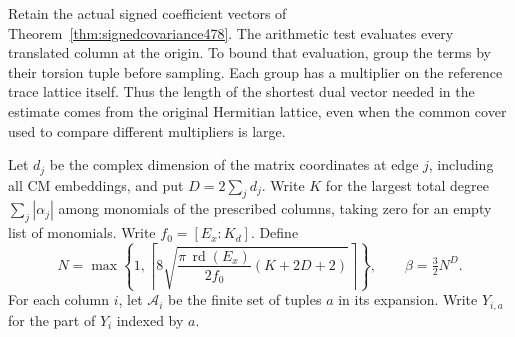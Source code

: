 \documentclass[a4paper,11pt]{article}
\theoremstyle{definition}
\theoremstyle{remark}
\numberwithin{equation}{section}
\begin{document}
Retain the actual signed coefficient vectors of
Theorem~\ref{thm:signedcovariance478}. The arithmetic test evaluates
every translated column at the origin. To bound that evaluation,
group the terms by their torsion tuple before sampling. Each
group has a multiplier on the reference trace lattice itself.
Thus the length of the shortest dual vector needed in the estimate
comes from the original Hermitian lattice, even when the common
cover used to compare different multipliers is large.

Let \(d_j\) be the complex dimension of the matrix coordinates at
edge \(j\), including all CM embeddings, and put \(D=2\sum_jd_j\).
Write \(K\) for the largest total degree \(\sum_j|\alpha_j|\)
among monomials of the prescribed columns, taking zero for an
empty list of monomials. Write \(f_0=[E_x:K_d]\). Define
\[
 N=\max\left\{1,\left\lceil
     8\sqrt{\frac{\pi\,\operatorname{rd}(E_x)}{2f_0}
                                      (K+2D+2)}\right\rceil\right\},
 \qquad \beta=\tfrac32 N^D .
\]
For each column \(i\), let \(\mathcal A_i\) be the finite set
of tuples \(a\) in its expansion. Write \(Y_{i,a}\) for the
part of \(Y_i\) indexed by \(a\).
\end{document}
